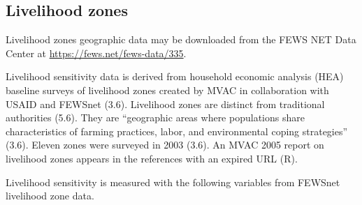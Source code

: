 \documentclass[
]{article}
\begin{document}
\hypertarget{livelihood-zones}{%
\subsection{Livelihood zones}\label{livelihood-zones}}

Livelihood zones geographic data may be downloaded from the FEWS NET
Data Center at \url{https://fews.net/fews-data/335}.

Livelihood sensitivity data is derived from household economic analysis
(HEA) baseline surveys of livelihood zones created by MVAC in
collaboration with USAID and FEWSnet (3.6). Livelihood zones are
distinct from traditional authorities (5.6). They are ``geographic areas
where populations share characteristics of farming practices, labor, and
environmental coping strategies'' (3.6). Eleven zones were surveyed in
2003 (3.6). An MVAC 2005 report on livelihood zones appears in the
references with an expired URL (R).

Livelihood sensitivity is measured with the following variables from
FEWSnet livelihood zone data.
\end{document}
